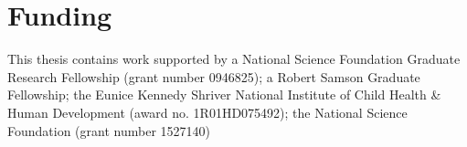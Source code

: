 \chapter*{Funding}

This thesis contains work supported by a National Science Foundation Graduate
Research Fellowship (grant number 0946825); a Robert Samson Graduate Fellowship;
the Eunice Kennedy Shriver National Institute of Child Health \& Human
Development (award no. 1R01HD075492); the National Science Foundation (grant
number 1527140)
